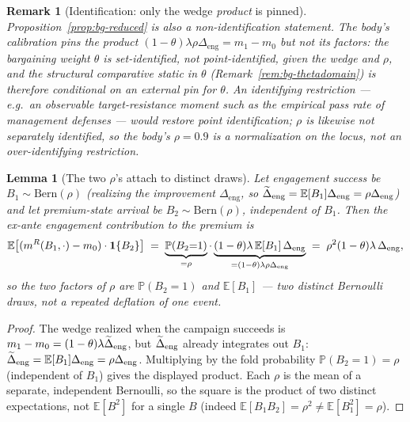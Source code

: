\documentclass[11pt]{article}
\newtheorem{lemma}{Lemma}
\newcommand{\E}{\mathbb{E}}
\newcommand{\PP}{\mathbb{P}}
\newcommand{\1}{\mathbf{1}}
\newtheorem{remark}{Remark}
\begin{document}
\begin{remark}[Identification: only the wedge \emph{product} is pinned]
\label{rem:bg-ident}
Proposition~\ref{prop:bg-reduced} is also a \emph{non}-identification statement. The body's calibration pins the product $(1-\theta)\lambda\rho\Delta_{\mathrm{eng}}=m_{1}-m_{0}$ but not its factors: the bargaining weight $\theta$ is \emph{set-identified}, not point-identified, given the wedge and $\rho$, and the structural comparative static in $\theta$ (Remark~\ref{rem:bg-thetadomain}) is therefore conditional on an external pin for $\theta$. An identifying restriction --- e.g.\ an observable target-resistance moment such as the empirical pass rate of management defenses --- would restore point identification; $\rho$ is likewise not separately identified, so the body's $\rho=0.9$ is a normalization on the locus, not an over-identifying restriction.
\end{remark}

\begin{lemma}[The two $\rho$'s attach to distinct draws]
\label{lem:bg-tree}
Let engagement success be $B_{1}\sim\mathrm{Bern}(\rho)$ (realizing the improvement $\Delta_{\mathrm{eng}}$, so $\Dtil_{\mathrm{eng}}=\E[B_{1}]\Delta_{\mathrm{eng}}=\rho\Delta_{\mathrm{eng}}$) and let premium-state arrival be $B_{2}\sim\mathrm{Bern}(\rho)$, independent of $B_{1}$. Then the ex-ante engagement contribution to the premium is
\[
  \E\bigl[(\mR(B_{1},\cdot)-m_{0})\cdot\1\{B_{2}\}\bigr]
   \;=\;\underbrace{\PP(B_{2}{=}1)}_{=\rho}\cdot
        \underbrace{(1-\theta)\lambda\,\E[B_{1}]\,\Delta_{\mathrm{eng}}}_{=(1-\theta)\lambda\rho\Delta_{\mathrm{eng}}}
   \;=\;\rho^{2}(1-\theta)\lambda\,\Delta_{\mathrm{eng}},
\]
so the two factors of $\rho$ are $\PP(B_{2}{=}1)$ and $\E[B_{1}]$ --- two distinct Bernoulli draws, not a repeated deflation of one event.
\end{lemma}
\begin{proof}
The wedge realized when the campaign succeeds is $m_{1}-m_{0}=(1-\theta)\lambda\widetilde{\Delta}_{\mathrm{eng}}$, but $\widetilde{\Delta}_{\mathrm{eng}}$ already integrates out $B_{1}$: $\Dtil_{\mathrm{eng}}=\E[B_{1}]\Delta_{\mathrm{eng}}=\rho\Delta_{\mathrm{eng}}$. Multiplying by the fold probability $\PP(B_{2}{=}1)=\rho$ (independent of $B_1$) gives the displayed product. Each $\rho$ is the mean of a separate, independent Bernoulli, so the square is the product of two distinct expectations, not $\E[B^{2}]$ for a single $B$ (indeed $\E[B_{1}B_{2}]=\rho^{2}\ne\E[B_{1}^{2}]=\rho$).
\end{proof}
\end{document}
